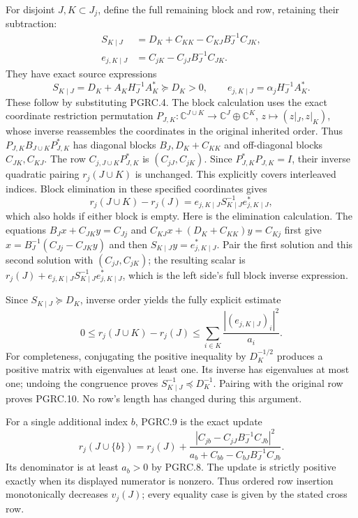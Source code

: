 For disjoint $J,K\subset J_j$, define the full remaining block
and row, retaining their subtraction:
\[
 \begin{aligned}
 S_{K\mid J}&=D_K+C_{KK}-C_{KJ}B_J^{-1}C_{JK},\\
 e_{j,K\mid J}&=C_{jK}-C_{jJ}B_J^{-1}C_{JK}.
 \end{aligned}
 \tag{PGRC.7}\label{eq:pgrc-remaining-block}
\]
They have exact source expressions
\[
 S_{K\mid J}=D_K+A_KH_J^{-1}A_K^*\succeq D_K>0,
 \qquad e_{j,K\mid J}=\alpha_jH_J^{-1}A_K^*.
 \tag{PGRC.8}\label{eq:pgrc-remaining-source}
\]
These follow by substituting PGRC.4. The block calculation uses
the exact coordinate restriction permutation
$P_{J,K}:\mathbb C^{J\cup K}\to\mathbb C^J\oplus\mathbb C^K$,
$z\mapsto(z|_J,z|_K)$, whose inverse reassembles the coordinates
in the original inherited order. Thus
$P_{J,K}B_{J\cup K}P_{J,K}^*$ has diagonal blocks
$B_J,D_K+C_{KK}$ and off-diagonal blocks $C_{JK},C_{KJ}$.
The row $C_{j,J\cup K}P_{J,K}^*$ is $(C_{jJ},C_{jK})$.
Since $P_{J,K}^*P_{J,K}=I$, their inverse quadratic pairing
$r_j(J\cup K)$ is unchanged. This explicitly covers interleaved
indices. Block elimination in these specified coordinates gives
\[
 r_j(J\cup K)-r_j(J)
 =e_{j,K\mid J}S_{K\mid J}^{-1}e_{j,K\mid J}^*,
 \tag{PGRC.9}\label{eq:pgrc-exact-remainder}
\]
which also holds if either block is empty. Here is the elimination
calculation. The equations
$B_Jx+C_{JK}y=C_{Jj}$ and
$C_{KJ}x+(D_K+C_{KK})y=C_{Kj}$ first give
$x=B_J^{-1}(C_{Jj}-C_{JK}y)$ and then
$S_{K\mid J}y=e_{j,K\mid J}^*$. Pair the first solution and this
second solution with $(C_{jJ},C_{jK})$; the resulting scalar is
$r_j(J)+e_{j,K\mid J}S_{K\mid J}^{-1}e_{j,K\mid J}^*$,
which is the left side's full block inverse expression.

Since $S_{K\mid J}\succeq D_K$, inverse order yields the fully
explicit estimate
\[
 0\leq r_j(J\cup K)-r_j(J)
 \leq\sum_{i\in K}\frac{|(e_{j,K\mid J})_i|^2}{a_i}.
 \tag{PGRC.10}\label{eq:pgrc-remainder-bound}
\]
For completeness, conjugating the positive inequality by
$D_K^{-1/2}$ produces a positive matrix with eigenvalues at least
one. Its inverse has eigenvalues at most one; undoing the
congruence proves $S_{K\mid J}^{-1}\preceq D_K^{-1}$.
Pairing with the original row proves PGRC.10. No row's length
has changed during this argument.

For a single additional index $b$, PGRC.9 is the exact update
\[
 r_j(J\cup\{b\})=r_j(J)+
 \frac{|C_{jb}-C_{jJ}B_J^{-1}C_{Jb}|^2}
 {a_b+C_{bb}-C_{bJ}B_J^{-1}C_{Jb}}.
 \tag{PGRC.11}\label{eq:pgrc-single-update}
\]
Its denominator is at least $a_b>0$ by PGRC.8. The update
is strictly positive exactly when its displayed numerator is
nonzero. Thus ordered row insertion monotonically decreases
$v_j(J)$; every equality case is given by the stated cross row.

